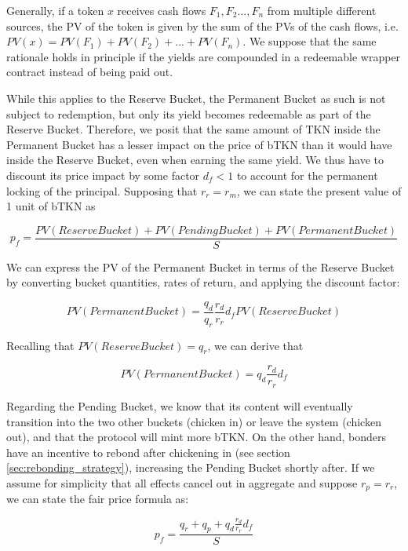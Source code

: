 \documentclass{article}
\begin{document}
Generally, if a token $x$ receives cash flows $F_1, F_2..., F_n$ from multiple different sources, the PV of the token is given by the sum of the PVs of the cash flows, i.e. $PV(x) = PV(F_1) + PV(F_2) + ... + PV(F_n)$. We suppose that the same rationale holds in principle if the yields are compounded in a redeemable wrapper contract instead of being paid out. 

While this applies to the Reserve Bucket, the Permanent Bucket as such is not subject to redemption, but only its yield becomes redeemable as part of the Reserve Bucket. Therefore, we posit that the same amount of TKN inside the Permanent Bucket has a lesser impact on the price of bTKN than it would have inside the Reserve Bucket, even when earning the same yield. We thus have to discount its price impact by some factor $d_f < 1$ to account for the permanent locking of the principal. Supposing that $r_r = r_m$, we can state the present value of 1 unit of bTKN as

\begin{equation}
  \label{eq:naive-1}
    p_f = \frac{PV(ReserveBucket) + PV(PendingBucket) + PV(PermanentBucket)}{S}
\end{equation}

We can express the PV of the Permanent Bucket in terms of the Reserve Bucket by converting bucket quantities, rates of return, and applying the discount factor:

\begin{equation}
  \label{eq:naive-2}
   PV(PermanentBucket) = \frac{q_d}{q_r} \frac{r_d}{r_r} d_f PV(ReserveBucket)
\end{equation}

Recalling that $PV(ReserveBucket) = q_r$, we can derive that

\begin{equation}
  \label{eq:naive-3}
   PV(PermanentBucket) = q_d \frac{r_d}{r_r} d_f
\end{equation}

Regarding the Pending Bucket, we know that its content will eventually transition into the two other buckets (chicken in) or leave the system (chicken out), and that the protocol will mint more bTKN. On the other hand, bonders have an incentive to rebond after chickening in (see section \ref{sec:rebonding_strategy}), increasing the Pending Bucket shortly after. If we assume for simplicity that all effects cancel out in aggregate and suppose $r_p = r_r$, we can state the fair price formula as:

\begin{equation}
  \label{eq:naive-4}
   p_f = \frac{q_r + q_p + q_d \frac{r_d}{r_r} d_f}{S}
\end{equation}
\end{document}
